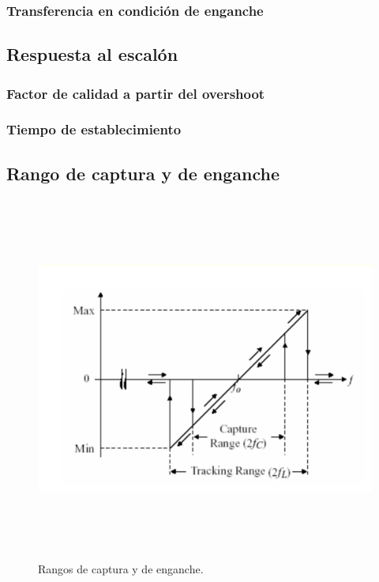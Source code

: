 	\subsubsection{Transferencia en condici\'on de enganche}

\subsection{Respuesta al escal\'on}

	\subsubsection{Factor de calidad a partir del overshoot}

	\subsubsection{Tiempo de establecimiento}

\subsection{Rango de captura y de enganche}

\begin{figure}[H] %
	\centering
	\includegraphics[width=12cm,height=12cm,keepaspectratio]{../EJ2/imagenes/rango.png}
	\caption{Rangos de captura y de enganche.}
	\label{rango}
\end{figure}

